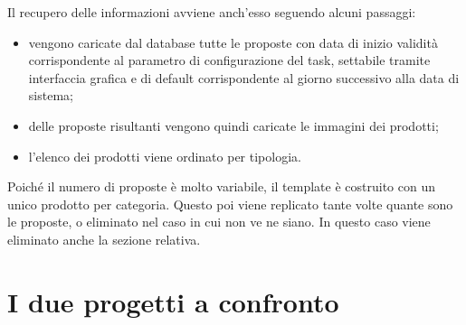 Il recupero delle informazioni avviene anch'esso seguendo alcuni passaggi:
\begin{itemize}
	\item vengono caricate dal database tutte le proposte con data di inizio validità corrispondente al parametro di configurazione del task, settabile tramite interfaccia grafica e di default corrispondente al giorno successivo alla data di sistema;
	\item delle proposte risultanti vengono quindi caricate le immagini dei prodotti;
	\item l'elenco dei prodotti viene ordinato per tipologia.
\end{itemize}
Poiché il numero di proposte è molto variabile, il template è costruito con un unico prodotto per categoria. Questo poi viene replicato tante volte quante sono le proposte, o eliminato nel caso in cui non ve ne siano. In questo caso viene eliminato anche la sezione relativa.


\section{I due progetti a confronto}